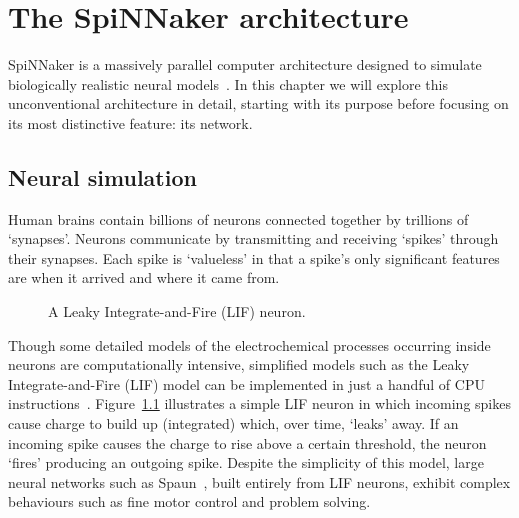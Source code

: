 \chapter{The SpiNNaker architecture}

	\label{sec:background}
	
	SpiNNaker is a massively parallel computer architecture designed to simulate
	biologically realistic neural models~\cite{furber07}. In this chapter we will
	explore this unconventional architecture in detail, starting with its purpose
	before focusing on its most distinctive feature: its network.
	
	
	\section{Neural simulation}
		
		Human brains contain billions of neurons connected together by trillions of
		`synapses'. Neurons communicate by transmitting and receiving `spikes'
		through their synapses. Each spike is `valueless' in that a spike's only
		significant features are when it arrived and where it came from.
		
		\begin{figure}
			\center
			
			\caption{A Leaky Integrate-and-Fire (LIF) neuron.}
			\label{fig:lif-neuron}
		\end{figure}
		
		Though some detailed models of the electrochemical processes occurring
		inside neurons are computationally intensive, simplified models such as the
		Leaky Integrate-and-Fire (LIF) model can be implemented in just a handful
		of CPU instructions~\cite{vainbrand11}. Figure~\ref{fig:lif-neuron}
		illustrates a simple LIF neuron in which incoming spikes cause charge to
		build up (integrated) which, over time, `leaks' away. If an incoming spike
		causes the charge to rise above a certain threshold, the neuron `fires'
		producing an outgoing spike. Despite the simplicity of this model, large
		neural networks such as Spaun~\cite{eliasmith12}, built entirely from LIF
		neurons, exhibit complex behaviours such as fine motor control and problem
		solving.
	
